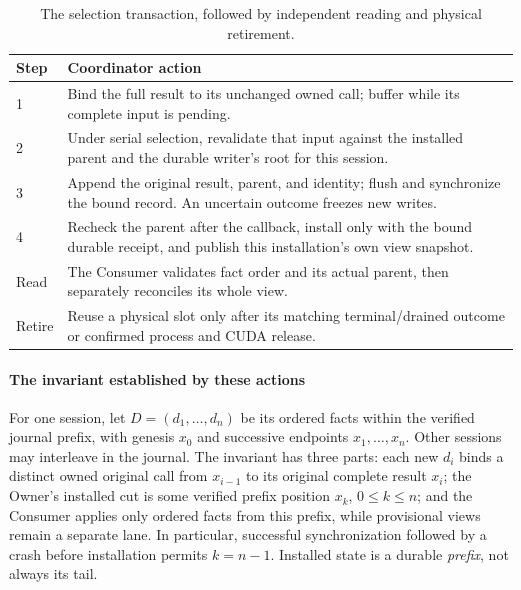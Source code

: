\begin{table}[t]
\centering
\caption{The selection transaction, followed by independent reading and
physical retirement.}
\label{tab:coordinator}
\begingroup\small\setlength{\tabcolsep}{3pt}
\begin{tabular}{@{}p{}>{\raggedright\arraybackslash}p{}@{}}
\toprule
Step & Coordinator action\\
\midrule
1 & Bind the full result to its unchanged owned call; buffer while its complete input is pending.\\
2 & Under serial selection, revalidate that input against the installed parent and the durable writer's root for this session.\\
3 & Append the original result, parent, and identity; flush and synchronize the bound record. An uncertain outcome freezes new writes.\\
4 & Recheck the parent after the callback, install only with the bound durable receipt, and publish this installation's own view snapshot.\\
Read & The Consumer validates fact order and its actual parent, then separately reconciles its whole view.\\
Retire & Reuse a physical slot only after its matching terminal/drained outcome or confirmed process and CUDA release.\\
\bottomrule
\end{tabular}\endgroup
\end{table}

\paragraph{The invariant established by these actions}
For one session, let $D=(d_1,\ldots,d_n)$ be its ordered facts within the
verified journal prefix, with genesis $x_0$ and successive endpoints
$x_1,\ldots,x_n$. Other sessions may interleave in the journal. The invariant
has three parts: each new $d_i$ binds a distinct owned original call
from $x_{i-1}$ to its original complete result $x_i$; the Owner's
installed cut is some verified prefix position $x_k$, $0\leq k\leq n$;
and the Consumer applies only ordered facts from this prefix, while
provisional views remain a separate lane. In particular, successful
synchronization followed by a crash before installation permits
$k=n-1$. Installed state is a durable \emph{prefix}, not always its tail.

